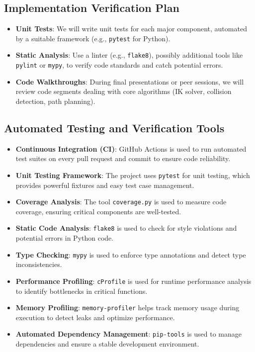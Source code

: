 \documentclass[12pt, titlepage]{article}
\begin{document}
\subsection{Implementation Verification Plan}

\begin{itemize}
  \item \textbf{Unit Tests}: We will write unit tests for each major component, automated by a suitable framework (e.g., \texttt{pytest} for Python).
  \item \textbf{Static Analysis}: Use a linter (e.g., \texttt{flake8}), possibly additional tools like \texttt{pylint} or \texttt{mypy}, to verify code standards and catch potential errors.
  \item \textbf{Code Walkthroughs}: During final presentations or peer sessions, we will review code segments dealing with core algorithms (IK solver, collision detection, path planning).
\end{itemize}

\subsection{Automated Testing and Verification Tools}

\begin{itemize}
  \item \textbf{Continuous Integration (CI)}: GitHub Actions is used to run automated test suites on every pull request and commit to ensure code reliability.
  \item \textbf{Unit Testing Framework}: The project uses \texttt{pytest} for unit testing, which provides powerful fixtures and easy test case management.
  \item \textbf{Coverage Analysis}: The tool \texttt{coverage.py} is used to measure code coverage, ensuring critical components are well-tested.
  \item \textbf{Static Code Analysis}: \texttt{flake8} is used to check for style violations and potential errors in Python code.
  \item \textbf{Type Checking}: \texttt{mypy} is used to enforce type annotations and detect type inconsistencies.
  \item \textbf{Performance Profiling}: \texttt{cProfile} is used for runtime performance analysis to identify bottlenecks in critical functions.
  \item \textbf{Memory Profiling}: \texttt{memory-profiler} helps track memory usage during execution to detect leaks and optimize performance.
  \item \textbf{Automated Dependency Management}: \texttt{pip-tools} is used to manage dependencies and ensure a stable development environment.
\end{itemize}
\end{document}

